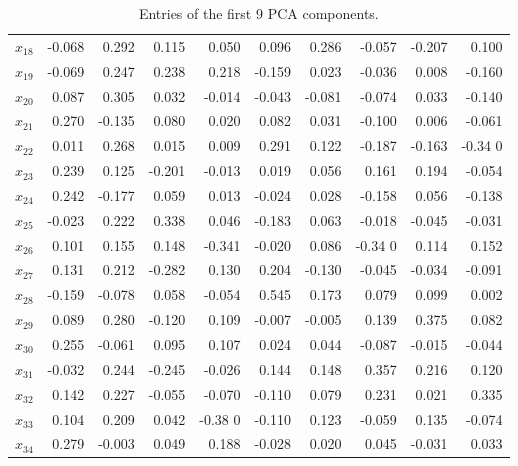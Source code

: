 \documentclass[10pt]{article}
\begin{document}
\begin{table}
\begin{center}
\begin{tabular}{crrrrrrrrr}
$x_{18}$	&	-0.068	&	0.292	&	0.115	&	0.050	&	0.096	&	0.286	&	-0.057	&	-0.207	&	0.100	\\
$x_{19}$	&	-0.069	&	0.247	&	0.238	&	0.218	&	-0.159	&	0.023	&	-0.036	&	0.008	&	-0.160	\\
$x_{20}$	 &	0.087	&	0.305	&	0.032	&	-0.014	&	-0.043	&	-0.081	&	-0.074	&	0.033	&	-0.140	\\
$x_{21}$	  &	0.270       &	-0.135	&	0.080	&	0.020      &	0.082	&	0.031	&	-0.100     &	0.006	&	-0.061	\\		
$x_{22}$	&	0.011	&	0.268	&	0.015	&	0.009	&	0.291	&	0.122	&	-0.187	&	-0.163	&	-0.34	0       \\
$x_{23}$	&	0.239	&	0.125	&	-0.201	&	-0.013	&	0.019	&	0.056	&	0.161	&	0.194	&	-0.054	\\
$x_{24}$	&	0.242	&	-0.177	&	0.059	&	0.013	&	-0.024	&	0.028	&	-0.158	&	0.056	&	-0.138	\\
$x_{25}$	&	-0.023	&	0.222	&	0.338	&	0.046	&	-0.183	&	0.063	&	-0.018	&	-0.045	&	-0.031	\\
$x_{26}$	&	0.101	&	0.155	&	0.148	&	-0.341	&	-0.020	&	0.086	&	-0.34	0      &	0.114	&	0.152	\\
$x_{27}$	&	0.131	&	0.212	&	-0.282	&	0.130        &	0.204	&	-0.130	&	-0.045	&	-0.034	&	-0.091	\\	
$x_{28}$	&	-0.159	&	-0.078	&	0.058	&	-0.054	&	0.545	&	0.173	&	0.079	&	0.099	&	0.002	\\
$x_{29}$	&	0.089	&	0.280	&	-0.120	&	0.109	&	-0.007	&	-0.005	&	0.139	&	0.375	&	0.082	\\
$x_{30}$	&	0.255	&	-0.061	&	0.095	&	0.107	&	0.024	&	0.044	&	-0.087	&	-0.015	&	-0.044	\\
$x_{31}$	&	-0.032	&	0.244	&	-0.245	&	-0.026	&	0.144	&	0.148	&	0.357	&	0.216	&	0.120	\\
$x_{32}$	&	0.142	&	0.227	&	-0.055	&	-0.070	&	-0.110	&	0.079	&	0.231	&	0.021	&	0.335	\\
$x_{33}$	&	0.104	&	0.209	&	0.042	&	-0.38	0       &	-0.110	&	0.123	&	-0.059	&	0.135	&	-0.074	\\
$x_{34}$	&	0.279	&	-0.003	&	0.049	&	0.188	&	-0.028	&	0.020        &	0.045	&	-0.031	&	0.033	\\	
\hline
\end{tabular}
\caption{Entries of the first 9 PCA components.}
\label{comp9coef}
\end{center}
\end{table}
\end{document}
